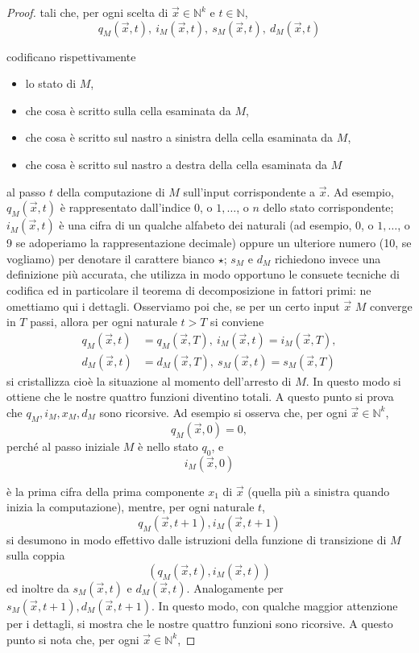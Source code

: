 \begin{proof}
    tali che, per ogni scelta di $\vec{x} \in \mathbb{N}^k$ e $t \in
        \mathbb{N}$,
    $$
        q_M(\vec{x}, t), \ i_M(\vec{x}, t), \ s_M(\vec{x}, t), \ d_M(\vec{x}, t)
    $$

    codificano rispettivamente

    \begin{itemize}
        \item lo stato di $M$,
        \item che cosa è scritto sulla cella esaminata da $M$,
        \item che cosa è scritto sul nastro a sinistra della cella esaminata da $M$,
        \item che cosa è scritto sul nastro a destra della cella esaminata da $M$
    \end{itemize}

    al passo $t$ della computazione di $M$ sull'input
    corrispondente a $\vec{x}$. Ad esempio, $q_M(\vec{x}, t)$ è rappresentato
    dall'indice 0, o $1, \ldots$, o $n$ dello stato corrispondente;
    $i_M(\vec{x}, t)$ è una cifra di un qualche alfabeto dei naturali (ad
    esempio, 0, o $1, \ldots$, o 9 se adoperiamo la rappresentazione decimale)
    oppure un ulteriore numero (10, se vogliamo) per denotare il carattere
    bianco $\star$; $s_M$ e $d_M$ richiedono invece una definizione più accurata,
    che utilizza in modo opportuno le consuete tecniche di codifica ed in
    particolare il teorema di decomposizione in fattori primi: ne omettiamo qui
    i dettagli. Osserviamo poi che, se per un certo input $\vec{x}$  $M$ converge
    in $T$ passi, allora per ogni naturale $t>T$ si conviene
    $$
        \begin{aligned}
            q_M(\vec{x}, t) & =q_M(\vec{x}, T), \ i_M(\vec{x}, t)=i_M(\vec{x}, T), \\
            d_M(\vec{x}, t) & =d_M(\vec{x}, T), \ s_M(\vec{x}, t)=s_M(\vec{x}, T)
        \end{aligned}
    $$
    si cristallizza cioè la situazione al momento dell'arresto di $M$. In questo
    modo si ottiene che le nostre quattro funzioni diventino totali. A questo
    punto si prova che $q_M, i_M, x_M, d_M$ sono ricorsive. Ad esempio si
    osserva che, per ogni $\vec{x} \in \mathbb{N}^k$,
    $$
        q_M(\vec{x}, 0)=0,
    $$
    perché al passo iniziale $M$ è nello stato $q_0$, e
    $$
        i_M(\vec{x}, 0)
    $$

    è la prima cifra della prima componente $x_1$ di $\vec{x}$ (quella più a
    sinistra quando inizia la computazione), mentre, per ogni naturale $t$,
    $$
        q_M(\vec{x}, t+1), i_M(\vec{x}, t+1)
    $$
    si desumono in modo effettivo dalle istruzioni della funzione di transizione di
    $M$ sulla coppia
    $$
        \left(q_M(\vec{x}, t), i_M(\vec{x}, t)\right)
    $$
    ed inoltre da $s_M(\vec{x}, t)$ e $d_M(\vec{x}, t)$. Analogamente per
    $s_M(\vec{x}, t+1), d_M(\vec{x}, t+1)$. In questo modo, con qualche maggior
    attenzione per i dettagli, si mostra che le nostre quattro funzioni sono
    ricorsive. A questo punto si nota che, per ogni $\vec{x} \in \mathbb{N}^k$,


\end{proof}
